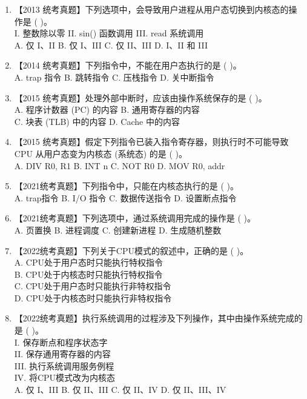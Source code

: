 \documentclass[lang=cn,newtx,10pt,scheme=chinese]{../../elegantbook}
\begin{document}
\begin{enumerate}
    \item 【2013 统考真题】下列选项中，会导致用户进程从用户态切换到内核态的操作是 (    )。\\
    I. 整数除以零 \quad II. sin() 函数调用 \quad III. read 系统调用\\
    A. 仅 I、II \quad B. 仅 I、III \quad C. 仅 II、III \quad D. I、II 和 III

    \item 【2014 统考真题】下列指令中，不能在用户态执行的是 (    )。\\
    A. trap 指令 \quad B. 跳转指令 \quad C. 压栈指令 \quad D. 关中断指令

    \item 【2015 统考真题】处理外部中断时，应该由操作系统保存的是 (    )。\\
    A. 程序计数器 (PC) 的内容 \quad B. 通用寄存器的内容\\
    C. 块表 (TLB) 中的内容 \quad D. Cache 中的内容

    \item 【2015 统考真题】假定下列指令已装入指令寄存器，则执行时不可能导致 CPU 从用户态变为内核态 (系统态) 的是 (    )。\\
    A. DIV R0, R1 \quad B. INT n \quad C. NOT R0 \quad D. MOV R0, addr

    \item 【2021统考真题】下列指令中，只能在内核态执行的是 (    )。\\
    A. trap指令 \quad B. I/O 指令 \quad C. 数据传送指令 \quad D. 设置断点指令

    \item 【2021统考真题】下列选项中，通过系统调用完成的操作是 (    )。\\
    A. 页置换 \quad B. 进程调度 \quad C. 创建新进程 \quad D. 生成随机整数

    \item 【2022统考真题】下列关于CPU模式的叙述中，正确的是 (    )。\\
    A. CPU处于用户态时只能执行特权指令\\
    B. CPU处于内核态时只能执行特权指令\\
    C. CPU处于用户态时只能执行非特权指令\\
    D. CPU处于内核态时只能执行非特权指令

    \item 【2022统考真题】执行系统调用的过程涉及下列操作，其中由操作系统完成的是 (    )。\\
    I. 保存断点和程序状态字\\
    II. 保存通用寄存器的内容\\
    III. 执行系统调用服务例程\\
    IV. 将CPU模式改为内核态\\
    A. 仅 I、III \quad B. 仅 II、III \quad C. 仅 II、IV \quad D. 仅 II、III、IV


\end{enumerate}
\end{document}
